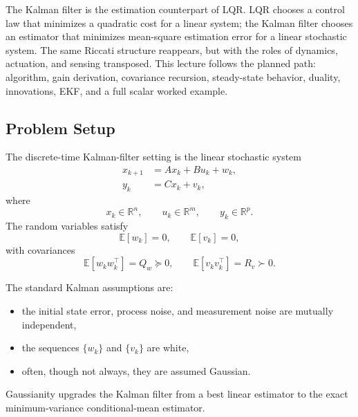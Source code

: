 \label{lec:l7}

\begin{intuition}
	The Kalman filter is the estimation counterpart of LQR. LQR chooses a control law that minimizes a quadratic cost for a linear system; the Kalman filter chooses an estimator that minimizes mean-square estimation error for a linear stochastic system. The same Riccati structure reappears, but with the roles of dynamics, actuation, and sensing transposed. This lecture follows the planned path: algorithm, gain derivation, covariance recursion, steady-state behavior, duality, innovations, EKF, and a full scalar worked example.
\end{intuition}

\subsection{Problem Setup}
\label{sec:l7-problem-setup}

\begin{definition}\label{def:l7-linear-stochastic-state-space-model}
	The discrete-time Kalman-filter setting is the linear stochastic system
	\begin{align*}
		x_{k+1} &= A x_k + B u_k + w_k, \\
		y_k &= C x_k + v_k,
	\end{align*}
	where
	\[
		x_k \in \mathbb{R}^n,
		\qquad
		u_k \in \mathbb{R}^m,
		\qquad
		y_k \in \mathbb{R}^p.
	\]
	The random variables satisfy
	\[
		\mathbb{E}[w_k]=0,
		\qquad
		\mathbb{E}[v_k]=0,
	\]
	with covariances
	\[
		\mathbb{E}[w_k w_k^\top]=Q_w \succeq 0,
		\qquad
		\mathbb{E}[v_k v_k^\top]=R_v \succ 0.
	\]
\end{definition}

\begin{notation}
	The standard Kalman assumptions are:
	\begin{itemize}
		\item the initial state error, process noise, and measurement noise are mutually independent,
		\item the sequences $\{w_k\}$ and $\{v_k\}$ are white,
		\item often, though not always, they are assumed Gaussian.
	\end{itemize}
	Gaussianity upgrades the Kalman filter from a best linear estimator to the exact minimum-variance conditional-mean estimator.
\end{notation}

